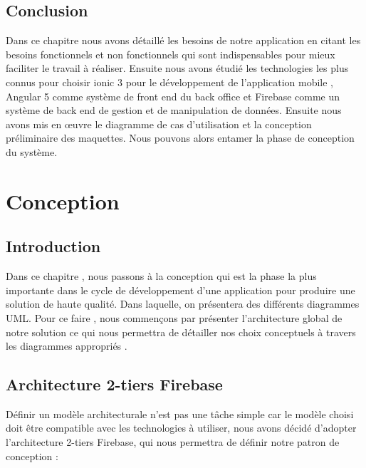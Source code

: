 \documentclass[11pt,a4paper,oneside]{book}
\begin{document}
			\section{Conclusion}
			Dans ce chapitre nous avons détaillé les besoins de notre application en citant les besoins fonctionnels et non fonctionnels qui sont indispensables pour mieux faciliter le travail à réaliser. Ensuite nous avons étudié les technologies les plus connus pour choisir ionic 3 pour le développement de l’application mobile , Angular 5 comme système de front end du back office et Firebase comme un système de back end de gestion et de manipulation de données. Ensuite nous avons mis en œuvre le diagramme de cas d’utilisation
			et la conception préliminaire des maquettes. Nous pouvons alors entamer la phase de conception du système.
			\chapter{Conception}
			\section{Introduction}
			Dans ce chapitre , nous passons à la conception qui est la phase la plus importante dans le cycle de développement d’une application pour produire une solution de haute qualité. Dans laquelle, on présentera des différents diagrammes UML.
			Pour ce faire , nous commençons par présenter l’architecture global de notre solution ce qui nous permettra de détailler nos choix conceptuels à travers les diagrammes appropriés .
			
			\section{Architecture 2-tiers Firebase}
			Définir un modèle architecturale n’est pas une tâche simple car le modèle choisi doit être compatible avec les technologies à utiliser, nous avons décidé d'adopter l’architecture 2-tiers Firebase, qui nous permettra de définir notre patron de conception : 
			\\
			
\end{document}
